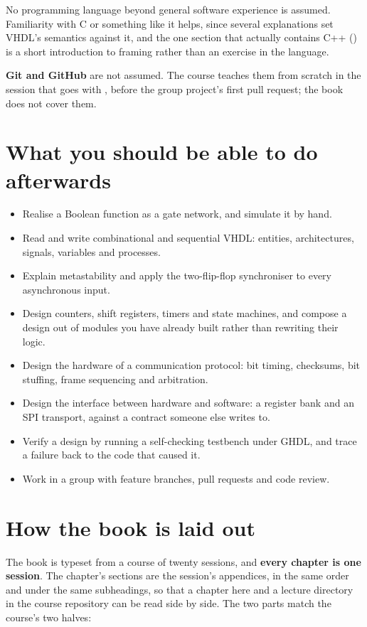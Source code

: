 No programming language beyond general software experience is assumed. Familiarity with C or
something like it helps, since several explanations set VHDL's semantics against it, and the one
section that actually contains C++ () is a short introduction to framing
rather than an exercise in the language.

\textbf{Git and GitHub} are not assumed. The course teaches them from scratch in the session that
goes with , before the group project's first pull request; the book does not cover
them.

\section*{What you should be able to do afterwards}
\begin{itemize}
  \item Realise a Boolean function as a gate network, and simulate it by hand.
  \item Read and write combinational and sequential VHDL: entities, architectures, signals,
    variables and processes.
  \item Explain metastability and apply the two-flip-flop synchroniser to every asynchronous
    input.
  \item Design counters, shift registers, timers and state machines, and compose a design out of
    modules you have already built rather than rewriting their logic.
  \item Design the hardware of a communication protocol: bit timing, checksums, bit stuffing,
    frame sequencing and arbitration.
  \item Design the interface between hardware and software: a register bank and an SPI transport,
    against a contract someone else writes to.
  \item Verify a design by running a self-checking testbench under GHDL, and trace a failure back
    to the code that caused it.
  \item Work in a group with feature branches, pull requests and code review.
\end{itemize}

\section*{How the book is laid out}
The book is typeset from a course of twenty sessions, and \textbf{every chapter is one session}.
The chapter's sections are the session's appendices, in the same order and under the same
subheadings, so that a chapter here and a lecture directory in the course repository can be read
side by side. The two parts match the course's two halves:

